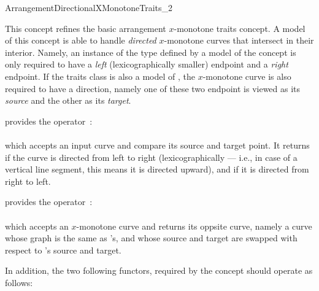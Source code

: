
\ccRefPageBegin

\begin{ccRefConcept}{ArrangementDirectionalXMonotoneTraits_2}

\ccDefinition

This concept refines the basic arrangement $x$-monotone traits concept.
A model of this concept is able to handle \emph{directed} $x$-monotone curves
that intersect in their interior. Namely, an instance of the
 type defined by a model of the concept
 is only required to have a \emph{left}
(lexicographically smaller) endpoint and a \emph{right} endpoint.
If the traits class is also a model of
, the $x$-monotone curve is
also required to have a direction, namely one of these two endpoint is
viewed as its \emph{source} and the other as its \emph{target}.

\ccRefines
{}


\ccThreeToTwo

{provides the operator~: \\
  \\
 which accepts an input curve  and compare its source and target
 point. It returns  if the curve is directed from left to right
 (lexicographically --- i.e., in case of a vertical line segment, this means
 it is directed upward), and  if it is directed from right to
 left.}

{provides the operator~: \\
  \\
 which accepts an $x$-monotone curve  and returns its oppsite curve,
 namely a curve whose graph is the same as 's, and whose source and
 target are swapped with respect to 's source and target.}

In addition, the two following functors, required by the concept
 should operate as follows:


\end{ccRefConcept}
